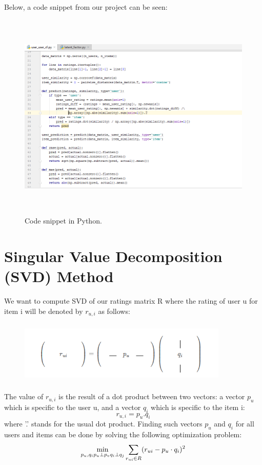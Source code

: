 \documentclass[12pt,a4paper]{report}
\begin{document}
Below, a code snippet from our project can be seen:

\begin{figure}[h]
    \centering
    \includegraphics[width=15cm, height=10cm]{code.png}
    \caption{Code snippet in Python.}
\end{figure}

\section{Singular Value Decomposition (SVD) Method}

We want to compute SVD of our ratings matrix R where the rating of user u for item i will be denoted by $ r_{u,i} $ as follows:

\begin{figure}[H]
    \centering
    \includegraphics[width=10cm, height=3cm]{svd.png}
\end{figure}

 The value of $r_{u,i}$ is the result of a dot product between two vectors: a vector $p_u$ which is specific to the user u, and a vector $q_i$ which is specific to the item i:
  $$r_{u,i}=p_u.q_i$$
   where '.' stands for the usual dot product.
   Finding such vectors $p_u$ and $q_i$ for all users and items can be done by solving the following optimization problem:
  $$ \min_{p_u, q_i\\p_u \perp p_v\\ q_i \perp q_j}\sum_{r_{ui} \in R} (r_{ui} - p_u \cdot q_i)^2 $$
  
\end{document}
